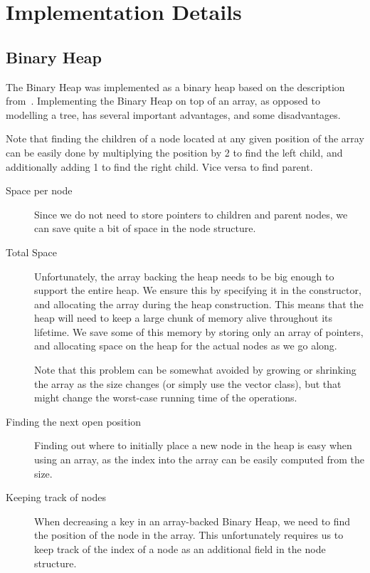 \section{Implementation Details}

\subsection{Binary Heap}

The Binary Heap was implemented as a binary heap based on the description from~\cite{AlgInC}.
Implementing the Binary Heap on top of an array, as opposed to modelling a tree, has several important advantages, and some disadvantages.

Note that finding the children of a node located at any given position of the array can be easily done by multiplying the position by 2 to find the left child, and additionally adding 1 to find the right child. Vice versa to find parent.

\begin{description}

\item[Space per node] Since we do not need to store pointers to children and parent nodes, we can save quite a bit of space in the node structure.

\item[Total Space] Unfortunately, the array backing the heap needs to be big enough to support the entire heap. We ensure this by specifying it in the constructor, and allocating the array during the heap construction. This means that the heap will need to keep a large chunk of memory alive throughout its lifetime. We save some of this memory by storing only an array of pointers, and allocating space on the heap for the actual nodes as we go along.

Note that this problem can be somewhat avoided by growing or shrinking the array as the size changes (or simply use the vector class), but that might change the worst-case running time of the operations.

\item[Finding the next open position] Finding out where to initially place a new node in the heap is easy when using an array, as the index into the array can be easily computed from the size.

\item[Keeping track of nodes] When decreasing a key in an array-backed Binary Heap, we need to find the position of the node in the array. This unfortunately requires us to keep track of the index of a node as an additional field in the node structure.

\end{description}

